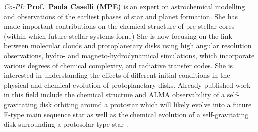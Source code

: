 \documentclass[10pt,fleqn,twoside]{article}
\begin{document}
{\it Co-PI:} {\bf Prof.\ Paola Caselli (MPE)} 
is an expert on astrochemical
modelling and observations of the earliest phases of star and planet
formation. She has made important contributions on the chemical structure
of pre-stellar cores (within which future stellar systems form.)
She is
now focusing on the link between molecular clouds and protoplanetary
disks using high angular resolution observations, hydro- and
magneto-hydrodynamical simulations, which incorporate various degrees
of chemical complexity, and radiative transfer codes. She is
interested in understanding the effects of different initial
conditions in the physical and chemical evolution of protoplanetary
disks. Already published work in this field include the chemical
structure and ALMA observability of a self-gravitating disk orbiting
around a protostar which will likely evolve into a future F-type main
sequence star \citep{2011MNRAS.417.2950I, 2013MNRAS.433.2064D}
as well as the
chemical evolution of a self-gravitating disk surrounding a
protosolar-type star \citep{2015MNRAS.453.1147E}. 
\end{document}
